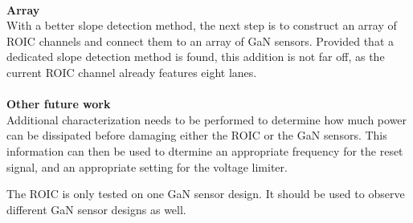 \\
\textbf{Array}\\
With a better slope detection method, the next step is to construct an array of ROIC channels and connect them to an array of GaN sensors. Provided that a dedicated slope detection method is found, this addition is not far off, as the current ROIC channel already features eight lanes.\\
\\
\textbf{Other future work}\\
Additional characterization needs to be performed to determine how much power can be dissipated before damaging either the ROIC or the GaN sensors. This information can then be used to dtermine an appropriate frequency for the reset signal, and an appropriate setting for the voltage limiter.

The ROIC is only tested on one GaN sensor design. It should be used to observe different GaN sensor designs as well.


